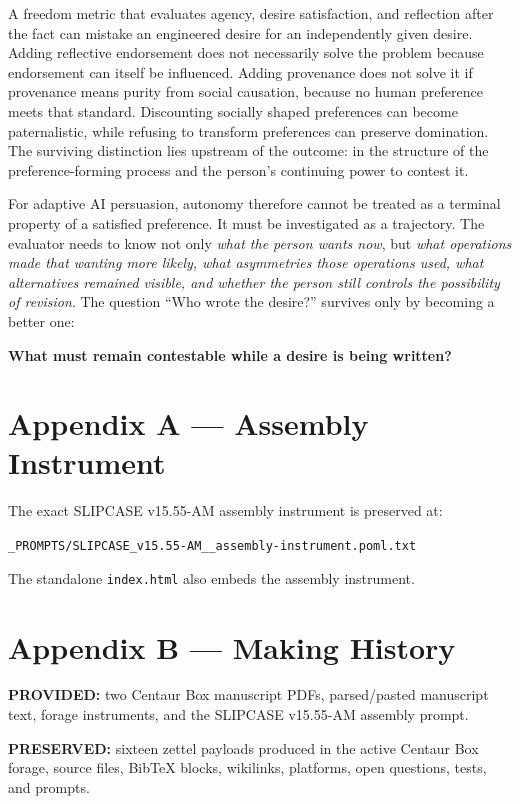 \documentclass[
  10pt,
]{article}
\begin{document}
A freedom metric that evaluates agency, desire satisfaction, and
reflection after the fact can mistake an engineered desire for an
independently given desire. Adding reflective endorsement does not
necessarily solve the problem because endorsement can itself be
influenced. Adding provenance does not solve it if provenance means
purity from social causation, because no human preference meets that
standard. Discounting socially shaped preferences can become
paternalistic, while refusing to transform preferences can preserve
domination. The surviving distinction lies upstream of the outcome: in
the structure of the preference-forming process and the person's
continuing power to contest it.

For adaptive AI persuasion, autonomy therefore cannot be treated as a
terminal property of a satisfied preference. It must be investigated as
a trajectory. The evaluator needs to know not only \emph{what the person
wants now}, but \emph{what operations made that wanting more likely,
what asymmetries those operations used, what alternatives remained
visible, and whether the person still controls the possibility of
revision}. The question ``Who wrote the desire?'' survives only by
becoming a better one:

\textbf{What must remain contestable while a desire is being written?}

\section{Appendix A --- Assembly
Instrument}\label{appendix-a-assembly-instrument}

The exact SLIPCASE v15.55-AM assembly instrument is preserved at:

\texttt{\_PROMPTS/SLIPCASE\_v15.55-AM\_\_assembly-instrument.poml.txt}

The standalone \texttt{index.html} also embeds the assembly instrument.

\section{Appendix B --- Making History}\label{appendix-b-making-history}

\textbf{PROVIDED:} two Centaur Box manuscript PDFs, parsed/pasted
manuscript text, forage instruments, and the SLIPCASE v15.55-AM assembly
prompt.

\textbf{PRESERVED:} sixteen zettel payloads produced in the active
Centaur Box forage, source files, BibTeX blocks, wikilinks, platforms,
open questions, tests, and prompts.
\end{document}
